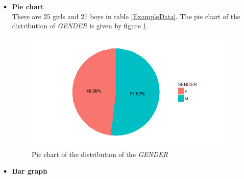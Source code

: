 \documentclass[a4paper, 12pt,twoside]{book}
\begin{document}
\begin{itemize}

\item \textbf{Pie chart}\vspace{0.3cm}\\
There are 25 girls and 27 boys in table \ref{ExampleData}. The pie chart of the  distribution of \textit{GENDER} is given by figure \ref{piechart}.
  \begin{center}
    \begin{figure}[!htb]
     \centering
    \includegraphics[scale=0.35]{PieChart.png}
    \caption{Pie chart of the distribution of the \textit{GENDER} }
    \label{piechart}
    \end{figure}  
\end{center} 

\item \textbf{Bar graph}\vspace{0.3cm}


\end{itemize}
\end{document}

